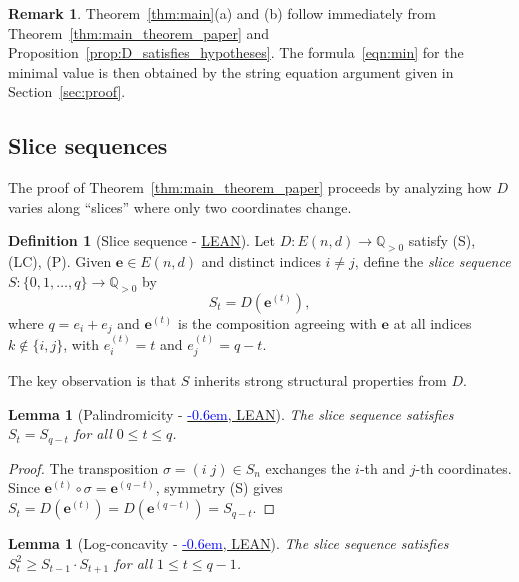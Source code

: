 \documentclass[12pt,reqno]{amsart}
\newtheorem{lemma}[theorem]{Lemma}
\theoremstyle{definition}
\newtheorem{definition}[theorem]{Definition}
\newtheorem{remark}[theorem]{Remark}
\newcommand\doublecheck{\textcolor{blue}{\checked\kern-0.6em\checked}}
\newcommand{\ee}{\mathbf{e}}
\newcommand{\QQ}{\mathbb{Q}}
\begin{document}
\begin{aiparagraph}
\begin{remark}
Theorem~\ref{thm:main}(a) and (b) follow immediately from Theorem~\ref{thm:main_theorem_paper} and Proposition~\ref{prop:D_satisfies_hypotheses}. The formula~\eqref{eqn:min} for the minimal value is then obtained by the string equation argument given in Section~\ref{sec:proof}.
\end{remark}

\subsection{Slice sequences} \label{sect:slice}

The proof of Theorem~\ref{thm:main_theorem_paper} proceeds by analyzing how $D$ varies along ``slices'' where only two coordinates change.

\begin{definition}[Slice sequence - \href{https://schmittj.github.io/balanced-vectors-blueprint/docs/BalancedVectors.html\#sliceSeq}{LEAN}]\label{def:sliceSeq}
Let $D : E(n,d) \to \QQ_{>0}$ satisfy \textup{(S)}, \textup{(LC)}, \textup{(P)}. Given $\ee \in E(n,d)$ and distinct indices $i \neq j$, define the \emph{slice sequence} $S : \{0, 1, \ldots, q\} \to \QQ_{>0}$ by
\[
S_t = D(\ee^{(t)}),
\]
where $q = e_i + e_j$ and $\ee^{(t)}$ is the composition agreeing with $\ee$ at all indices $k \notin \{i, j\}$, with $e^{(t)}_i = t$ and $e^{(t)}_j = q - t$.
\end{definition}

The key observation is that $S$ inherits strong structural properties from $D$.

\begin{lemma}[Palindromicity - \href{https://schmittj.github.io/balanced-vectors-blueprint/docs/BalancedVectors.html\#sliceSeq_palindromic}{\doublecheck, LEAN}]\label{lem:sliceSeq_palindromic}
The slice sequence satisfies $S_t = S_{q-t}$ for all $0 \leq t \leq q$.
\end{lemma}

\begin{proof}
The transposition $\sigma = (i \; j) \in S_n$ exchanges the $i$-th and $j$-th coordinates. Since $\ee^{(t)} \circ \sigma = \ee^{(q-t)}$, symmetry \textup{(S)} gives $S_t = D(\ee^{(t)}) = D(\ee^{(q-t)}) = S_{q-t}$.
\end{proof}

\begin{lemma}[Log-concavity - \href{https://schmittj.github.io/balanced-vectors-blueprint/docs/BalancedVectors.html\#sliceSeq_logconcave}{\doublecheck, LEAN}]\label{lem:sliceSeq_logconcave}
The slice sequence satisfies $S_t^2 \geq S_{t-1} \cdot S_{t+1}$ for all $1 \leq t \leq q - 1$.
\end{lemma}


\end{aiparagraph}
\end{document}
